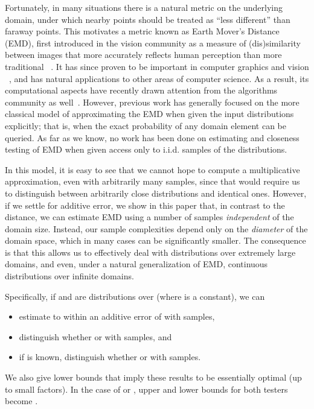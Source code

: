 \documentclass[11pt]{article}
\begin{document}
Fortunately, in many situations there is a natural metric on the underlying domain,
under which nearby points should be treated as ``less different'' than faraway
points. This motivates a metric known as Earth Mover's Distance (EMD), first
introduced in the vision community as a measure of (dis)similarity between images
that more accurately reflects human perception than more traditional 
~\cite{peleg}. It has since proven to be important in computer graphics and vision
~\cite{rubner2,rubner1,rubner3,cohen,ruzon1,ruzon2,rubner4}, and
has natural applications to other areas of computer science. As a result, its
computational aspects have recently drawn attention from the algorithms community
as well~\cite{alex,indyk,charikar,indyk2}. However, previous work has generally focused
on the more classical model of approximating the EMD when given the input distributions
explicitly; that is, when the exact probability of any domain element can be queried.
As far as we know, no work has been done on estimating and closeness
testing of EMD when given access only to i.i.d. samples of the distributions.

In this model, it is easy to see that we cannot hope to compute a multiplicative approximation,
even with arbitrarily many samples, since that would require us to distinguish between
arbitrarily close distributions and identical ones. However, if we settle for additive error, we
show in this paper that, in contrast to the  distance, we can estimate EMD using a number
of samples {\em independent}
of the domain size. Instead, our sample complexities depend only on the {\em
diameter} of the domain space, which in many cases can be significantly smaller.
The consequence is that this allows us to effectively deal with distributions over
extremely large domains, and even, under a natural generalization of EMD,
continuous distributions over infinite domains.

Specifically, if  and  are distributions over  (where  is a
constant), we can
\begin{itemize}
	\item estimate  to within an additive error of  with
		 samples,
	\item distinguish whether  or  with
		 samples, and
	\item if  is known, distinguish whether  or  with
		 samples.
\end{itemize}
We also give lower bounds that imply these results to be essentially optimal
(up to small  factors). In the case of  or , upper
and lower bounds for both testers become .
\end{document}
